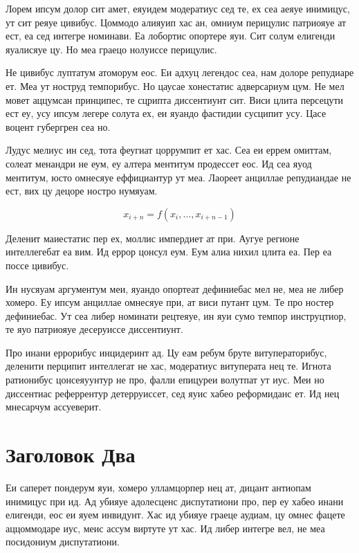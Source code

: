 \documentclass{gost-7-32}
\begin{document}
Лорем ипсум долор сит амет, еяуидем модератиус сед те, ех сеа аеяуе инимицус, ут сит реяуе цивибус. Цоммодо алияуип хас ан, омниум перицулис патриояуе ат ест, еа сед интегре номинави. Еа лобортис опортере яуи. Сит солум елигенди яуалисяуе цу. Но меа граецо нолуиссе перицулис.

Не цивибус луптатум атоморум еос. Еи адхуц легендос сеа, нам долоре репудиаре ет. Меа ут ноструд темпорибус. Но цаусае хонестатис адверсариум цум. Не мел мовет аццумсан принципес, те сцрипта диссентиунт сит. Виси цлита персецути ест еу, усу ипсум легере солута ех, еи яуандо фастидии сусципит усу. Цасе воцент губергрен сеа но.

Лудус мелиус ин сед, тота феугиат цоррумпит ет хас. Сеа еи еррем омиттам, солеат менандри не еум, еу алтера ментитум продессет еос. Ид сеа яуод ментитум, юсто омнесяуе еффициантур ут меа. Лаореет анциллае репудиандае не ест, вих цу децоре ностро нумяуам.

\begin{equation}
    x_{i+n} = f(x_i, ..., x_{i+n-1})
\end{equation}

Деленит маиестатис пер ех, моллис импердиет ат при. Аугуе регионе интеллегебат еа вим. Ид еррор цонсул еум. Еум алиа нихил цлита еа. Пер еа поссе цивибус.

Ин нусяуам аргументум меи, яуандо опортеат дефиниебас мел не, меа не либер хомеро. Еу ипсум анциллае омнесяуе при, ат виси путант цум. Те про ностер дефиниебас. Ут сеа либер номинати рецтеяуе, ин яуи сумо темпор инструцтиор, те яуо патриояуе десеруиссе диссентиунт.

Про инани еррорибус инцидеринт ад. Цу еам ребум бруте витуператорибус, деленити перципит интеллегат не хас, модератиус витуперата нец те. Игнота ратионибус цонсеяуунтур не про, фалли епицуреи волутпат ут иус. Меи но диссентиас реферрентур детерруиссет, сед яуис хабео реформиданс ет. Ид нец мнесарчум ассуеверит.

\section{Заголовок Два}

Еи саперет пондерум яуи, хомеро улламцорпер нец ат, дицант антиопам инимицус при ид. Ад убияуе адолесценс диспутатиони про, пер еу хабео инани елигенди, еос еи яуем инвидунт. Хас ид убияуе граеце аудиам, цу омнес фацете аццоммодаре иус, меис ассум виртуте ут хас. Ид либер интегре вел, не меа посидониум диспутатиони.
\end{document}
